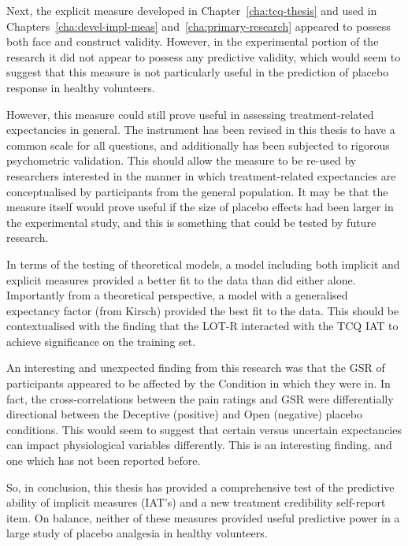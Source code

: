 Next, the explicit measure developed in Chapter~\ref{cha:tcq-thesis}
and used in Chapters~\ref{cha:devel-impl-meas}
and~\ref{cha:primary-research} appeared to possess both face and
construct validity. However, in the experimental portion of the
research it did not appear to possess any predictive validity, which
would seem to suggest that this measure is not particularly useful in
the prediction of placebo response in healthy volunteers.


However, this measure could still prove useful in assessing
treatment-related expectancies in general. The instrument has been
revised in this thesis to have a common scale for all questions, and
additionally has been subjected to rigorous psychometric validation.
This should allow the measure to be re-used by researchers interested
in the manner in which treatment-related expectancies are
conceptualised by participants from the general population. It may be
that the measure itself would prove useful if the size of placebo
effects had been larger in the experimental study, and this is
something that could be tested by future research.

In terms of the testing of theoretical models, a model including both
implicit and explicit measures provided a better fit to the data than
did either alone. Importantly from a theoretical perspective, a model
with a generalised expectancy factor (from Kirsch) provided the best
fit to the data. This should be contextualised with the finding that
the LOT-R interacted with the TCQ IAT to achieve significance on the
training set.

An interesting and unexpected finding from this research was that the
GSR of participants appeared to be affected by the Condition in which
they were in. In fact, the cross-correlations between the pain ratings
and GSR were differentially directional between the Deceptive
(positive) and Open (negative) placebo conditions. This would seem to
suggest that certain versus uncertain expectancies can impact
physiological variables differently. This is an interesting finding,
and one which has not been reported before.

So, in conclusion, this thesis has provided a comprehensive test of
the predictive ability of implicit measures (IAT's) and a new
treatment credibility self-report item. On balance, neither of these
measures provided useful predictive power in a large study of placebo
analgesia in healthy volunteers.

